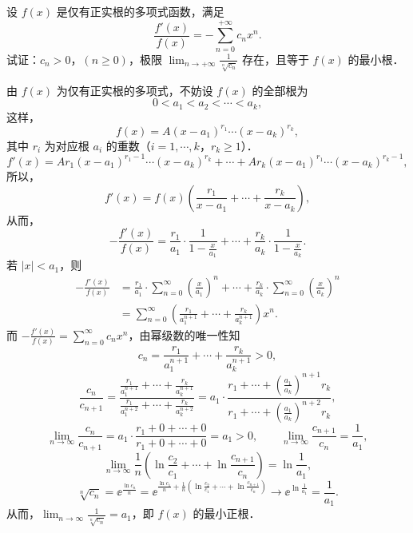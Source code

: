 设 $f(x)$ 是仅有正实根的多项式函数，满足
\[
  \frac{f'(x)}{f(x)}=-\sum_{n=0}^{+\infty}c_nx^n.
\]
试证：$c_n>0$，$(n\ge 0)$，极限 $\displaystyle \lim_{n\to+\infty}\frac{1}{\sqrt[n]{c_n}}$ 存在，且等于 $f(x)$ 的最小根．
\begin{solution}
由 $f(x)$ 为仅有正实根的多项式，不妨设 $f(x)$ 的全部根为
\[
0<a_1<a_2<\cdots<a_k,
\]
这样，
\[
f(x)=A(x-a_1)^{r_1}\cdots(x-a_k)^{r_k},
\]
其中 $r_i$ 为对应根 $a_i$ 的重数（$i=1,\cdots,k$，$r_k\ge1$）．
\[
f'(x)=Ar_1(x-a_1)^{r_1-1}\cdots(x-a_k)^{r_k}
+\cdots+Ar_k(x-a_1)^{r_1}\cdots(x-a_k)^{r_k-1},
\]
所以，
\[
f'(x)=f(x)\left(\frac{r_1}{x-a_1}+\cdots+\frac{r_k}{x-a_k}\right),
\]
从而，
\[
-\frac{f'(x)}{f(x)}=\frac{r_1}{a_1}\cdot\frac{1}{1-\frac{x}{a_1}}
+\cdots+\frac{r_k}{a_k}\cdot\frac{1}{1-\frac{x}{a_k}}.
\]
若 $|x|<a_1$，则
\begin{align*}
-\frac{f'(x)}{f(x)}
&=\frac{r_1}{a_1}\cdot\sum_{n=0}^{\infty}\left(\frac{x}{a_1}\right)^n
+\cdots+\frac{r_k}{a_k}\cdot\sum_{n=0}^{\infty}\left(\frac{x}{a_k}\right)^n\\
&=\sum_{n=0}^{\infty}\left(\frac{r_1}{a_1^{n+1}}+\cdots+\frac{r_k}{a_k^{n+1}}\right)x^n.
\end{align*}
而 $-\frac{f'(x)}{f(x)}=\sum_{n=0}^{\infty}c_nx^n$，由幂级数的唯一性知
\[
c_n=\frac{r_1}{a_1^{n+1}}+\cdots+\frac{r_k}{a_k^{n+1}}>0,
\]
\[
\frac{c_n}{c_{n+1}}
=\frac{\frac{r_1}{a_1^{n+1}}+\cdots+\frac{r_k}{a_k^{n+1}}}
{\frac{r_1}{a_1^{n+2}}+\cdots+\frac{r_k}{a_k^{n+2}}}
=a_1\cdot\frac{r_1+\cdots+\left(\frac{a_1}{a_k}\right)^{n+1}r_k}
{r_1+\cdots+\left(\frac{a_1}{a_k}\right)^{n+2}r_k},
\]
\[
\lim_{n\to\infty}\frac{c_n}{c_{n+1}}
=a_1\cdot\frac{r_1+0+\cdots+0}{r_1+0+\cdots+0}=a_1>0,\qquad
\lim_{n\to\infty}\frac{c_{n+1}}{c_n}=\frac{1}{a_1},
\]
\[
\lim_{n\to\infty}\frac{1}{n}\left(\ln\frac{c_2}{c_1}+\cdots+\ln\frac{c_{n+1}}{c_n}\right)=\ln\frac{1}{a_1},
\]
\[
\sqrt[n]{c_n}=\ee^{\frac{\ln c_n}{n}}
=\ee^{\frac{\ln c_1}{n}+\frac{1}{n}\left(\ln\frac{c_2}{c_1}+\cdots+\ln\frac{c_{n+1}}{c_n}\right)}
\to\ee^{\ln\frac{1}{a_1}}=\frac{1}{a_1}.
\]
从而，$\lim_{n\to\infty}\frac{1}{\sqrt[n]{c_n}}=a_1$，即 $f(x)$ 的最小正根．
\end{solution}

